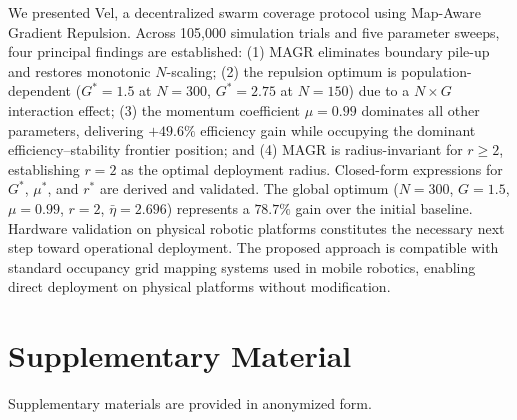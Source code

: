 \documentclass[journal,twoside,letterpaper]{IEEEtran}
\begin{document}
We presented Vel, a decentralized swarm coverage protocol using Map-Aware
Gradient Repulsion. Across 105,000 simulation trials and five parameter sweeps,
four principal findings are established: (1) MAGR eliminates boundary pile-up
and restores monotonic $N$-scaling; (2) the repulsion optimum is
population-dependent ($G^*=1.5$ at $N=300$, $G^*=2.75$ at $N=150$) due to a
$N\times G$ interaction effect; (3) the momentum coefficient $\mu=0.99$
dominates all other parameters, delivering $+49.6\%$ efficiency gain while
occupying the dominant efficiency--stability frontier position; and (4) MAGR is
radius-invariant for $r\geq2$, establishing $r=2$ as the optimal deployment
radius. Closed-form expressions for $G^*$, $\mu^*$, and $r^*$ are derived and
validated. The global optimum ($N=300$, $G=1.5$, $\mu=0.99$, $r=2$,
$\bar{\eta}=2.696$) represents a $78.7\%$ gain over the initial baseline.
Hardware validation on physical robotic platforms constitutes the necessary next
step toward operational deployment. The proposed approach is compatible with 
standard occupancy grid mapping systems used in mobile robotics, enabling direct 
deployment on physical platforms without modification.

\section*{Supplementary Material}
Supplementary materials are provided in anonymized form.
\end{document}
